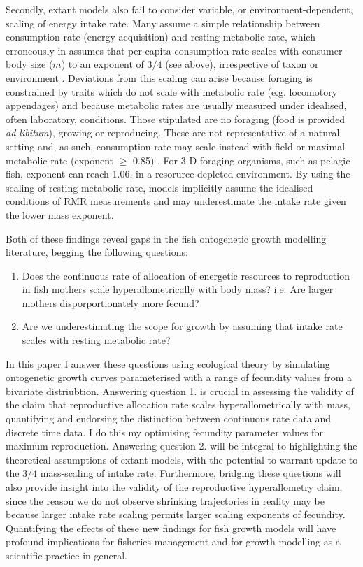 \documentclass[a4paper]{article} %
\begin{document}
    Secondly, extant models also fail to consider variable, or environment-dependent, scaling of energy intake rate. Many assume a simple relationship between consumption rate (energy acquisition) and resting metabolic rate, which erroneously in assumes that per-capita consumption rate scales with consumer body size ($m$) to an exponent of $3/4$ (see above), irrespective of taxon or environment \autocite{Pawar2012}. Deviations from this scaling can arise because foraging is constrained by traits which do not scale with metabolic rate (e.g. locomotory appendages) and because metabolic rates are usually measured under idealised, often laboratory, conditions. Those stipulated are no foraging (food is provided \textit{ad libitum}), growing or reproducing. These are not representative of a natural setting and, as such, consumption-rate may scale instead with field or maximal metabolic rate (exponent $\geq$ 0.85) \autocite{peters1983,Weibel2004, Pawar2012}. For 3-D foraging organisms, such as pelagic fish, exponent can reach 1.06, in a resorurce-depleted environment. By using the scaling of resting metabolic rate, models implicitly assume the idealised conditions of RMR measurements and may underestimate the intake rate given the lower mass exponent.
    
    Both of these findings reveal gaps in the fish ontogenetic growth modelling literature, begging the following questions:
    \begin{enumerate}
        \item Does the continuous rate of allocation of energetic resources to reproduction in fish mothers scale hyperallometrically with body mass? i.e. Are larger mothers disporportionately more fecund?
        \item Are we underestimating the scope for growth by assuming that intake rate scales with resting metabolic rate?
    \end{enumerate}
    In this paper I answer these questions using ecological theory by simulating ontogenetic growth curves parameterised with a range of fecundity values from a bivariate distriubtion. Answering question 1. is crucial in assessing the validity of the claim that reproductive allocation rate scales hyperallometrically with mass, quantifying and endorsing the distinction between continuous rate data and discrete time data. I do this my optimising fecundity parameter values for maximum reproduction. Answering question 2. will be integral to highlighting the theoretical assumptions of extant models, with the potential to warrant update to the $3/4$ mass-scaling of intake rate. Furthermore, bridging these questions will also provide insight into the validity of the reproductive hyperallometry claim, since the reason we do not observe shrinking trajectories in reality may be because larger intake rate scaling permits larger scaling exponents of fecundity. Quantifying the effects of these new findings for fish growth models will have profound implications for fisheries management and for growth modelling as a scientific practice in general.
\end{document}
